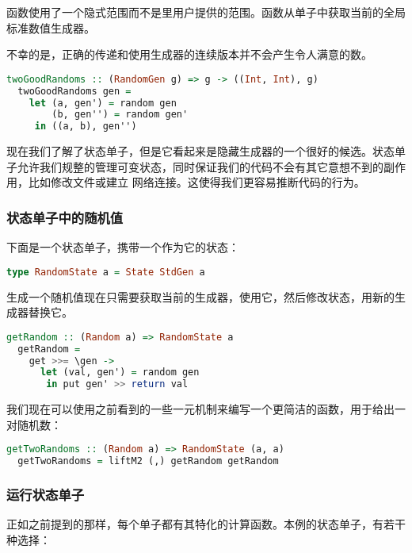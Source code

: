 \documentclass[./main.tex]{subfiles}
\begin{document}
函数使用了一个隐式范围而不是里用户提供的范围。函数从单子中获取当前的全局标准数值生成器。

不幸的是，正确的传递和使用生成器的连续版本并不会产生令人满意的数。

\begin{lstlisting}[language=Haskell]
  twoGoodRandoms :: (RandomGen g) => g -> ((Int, Int), g)
  twoGoodRandoms gen =
    let (a, gen') = random gen
        (b, gen'') = random gen'
     in ((a, b), gen'')
\end{lstlisting}

现在我们了解了状态单子，但是它看起来是隐藏生成器的一个很好的候选。状态单子允许我们规整的管理可变状态，同时保证我们的代码不会有其它意想不到的副作用，比如修改文件或建立
网络连接。这使得我们更容易推断代码的行为。

\subsubsection*{状态单子中的随机值}

下面是一个状态单子，携带一个作为它的状态：

\begin{lstlisting}[language=Haskell]
  type RandomState a = State StdGen a
\end{lstlisting}

生成一个随机值现在只需要获取当前的生成器，使用它，然后修改状态，用新的生成器替换它。

\begin{lstlisting}[language=Haskell]
  getRandom :: (Random a) => RandomState a
  getRandom =
    get >>= \gen ->
      let (val, gen') = random gen
       in put gen' >> return val
\end{lstlisting}

我们现在可以使用之前看到的一些一元机制来编写一个更简洁的函数，用于给出一对随机数：

\begin{lstlisting}[language=Haskell]
  getTwoRandoms :: (Random a) => RandomState (a, a)
  getTwoRandoms = liftM2 (,) getRandom getRandom
\end{lstlisting}

\subsubsection*{运行状态单子}

正如之前提到的那样，每个单子都有其特化的计算函数。本例的状态单子，有若干种选择：
\end{document}
